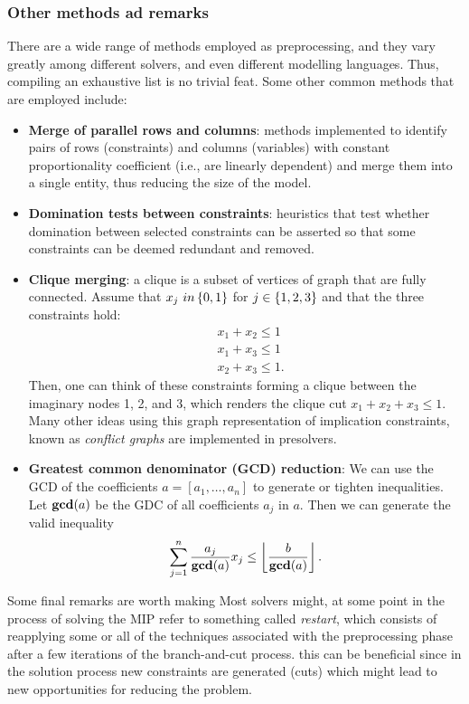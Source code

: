 \subsubsection{Other methods ad remarks}

There are a wide range of methods employed as preprocessing, and they vary greatly among different solvers, and even different modelling languages. Thus, compiling an exhaustive list is no trivial feat. Some other common methods that are employed include:
\begin{itemize}
	\item {\bf Merge of parallel rows and columns}: methods implemented to identify pairs of rows (constraints) and columns (variables) with constant proportionality coefficient (i.e., are linearly dependent) and merge them into a single entity, thus reducing the size of the model.
	\item {\bf Domination tests between constraints}: heuristics that test whether domination between selected constraints can be asserted so that some constraints can be deemed redundant and removed. 
	\item {\bf Clique merging}: a clique is a subset of vertices of graph that are fully connected. Assume that $x_j \ in \left\{ 0,1 \right \}$ for $j \in \left\{ 1,2,3 \right \}$ and that the three constraints hold:
	\begin{align*}
		& x_1 + x_2 \le 1 \\
		& x_1 + x_3 \le 1 \\
		& x_2 + x_3 \le 1.
	\end{align*}
	Then, one can think of these constraints forming a clique between the imaginary nodes 1, 2, and 3, which renders the clique cut $x_1 + x_2 + x_3 \le 1$. Many other ideas using this graph representation of implication constraints, known as \emph{conflict graphs} are implemented in presolvers.
	\item {\bf Greatest common denominator (GCD) reduction}: We can use the GCD of the coefficients $a = [a_1, \dots, a_n]$ to generate or tighten inequalities. Let $\text{{\bf gcd}}(a)$ be the GDC of all coefficients $a_j$ in $a$. Then we can generate the valid inequality
	\begin{equation*}
		\sum_{j=1}^n\frac{a_j}{\text{{\bf gcd}}(a)} x_j\leq \left\lfloor\frac{b}{\text{{\bf gcd}}(a)}\right \rfloor.
	\end{equation*}
\end{itemize}

 
Some final remarks are worth making Most solvers might, at some point in the process of solving the MIP refer to something called \emph{restart}, which consists of reapplying some or all of the techniques associated with the preprocessing phase after a few iterations of the branch-and-cut process. this can be beneficial since in the solution process new constraints are generated (cuts) which might lead to new opportunities for reducing the problem.

